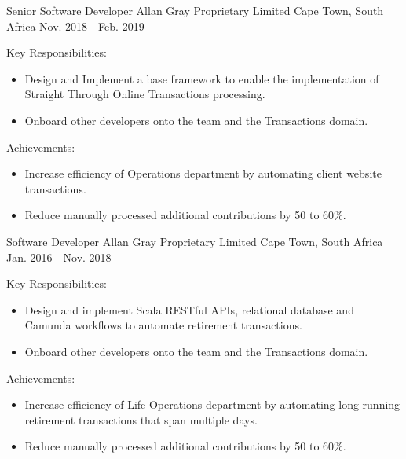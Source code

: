\begin{cventries}
  \cventry
    {Senior Software Developer} %
    {Allan Gray Proprietary Limited} %
    {Cape Town, South Africa} %
    {Nov. 2018 - Feb. 2019} %
    {
      \begin{cvitems} %
        \item {Key Responsibilities:}
        \begin{itemize}
          \item {Design and Implement a base framework to enable the implementation of Straight Through Online Transactions processing.}
          \item {Onboard other developers onto the team and the Transactions domain.}
        \end{itemize}
        \item {Achievements:}
        \begin{itemize}
          \item {Increase efficiency of Operations department by automating client website transactions.}
          \item {Reduce manually processed additional contributions by 50 to 60\%.}
        \end{itemize}
      \end{cvitems}
    }

  \cventry
    {Software Developer} %
    {Allan Gray Proprietary Limited} %
    {Cape Town, South Africa} %
    {Jan. 2016 - Nov. 2018} %
    {
      \begin{cvitems} %
        \item {Key Responsibilities:}
        \begin{itemize}
          \item {Design and implement Scala RESTful APIs, relational database and Camunda workflows to automate retirement transactions.}
          \item {Onboard other developers onto the team and the Transactions domain.}
        \end{itemize}
        \item {Achievements:}
        \begin{itemize}
          \item {Increase efficiency of Life Operations department by automating long-running retirement transactions that span multiple days.}
          \item {Reduce manually processed additional contributions by 50 to 60\%.}
        \end{itemize}
      \end{cvitems}
    }


\end{cventries}
